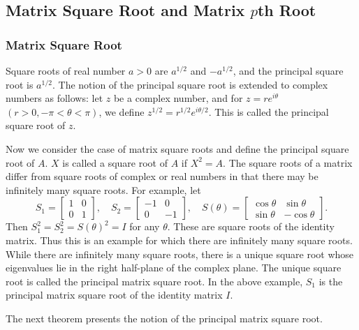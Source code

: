 \subsection{{Matrix Square Root and Matrix $p$th Root}}\label{sec:matrix-roots}

\subsubsection{{Matrix Square Root}}\label{subsec:newton-matrix-square-root}

{Square roots of real number $a>0$ are $a^{1/2}$ and $-a^{1/2}$, and the principal square root is $a^{1/2}$. The notion of the principal square root is extended to complex numbers as follows: let $z$ be a complex number, and for $z=re^{i\theta}$ $(r>0,-\pi<\theta<\pi)$, we define $z^{1/2}=r^{1/2}e^{i\theta/2}$. This is called the principal square root of $z$.}

{Now we consider the case of matrix square roots and define the principal square root of $A$. $X$ is called a square root of $A$ if $X^2=A$. The square roots of a matrix differ from square roots of complex or real numbers in that there may be infinitely many square roots. For example, let}
\[S_1=\begin{bmatrix}1&0\\0&1\end{bmatrix},\quad S_2=\begin{bmatrix}-1&0\\0&-1\end{bmatrix},\quad S(\theta)=\begin{bmatrix}\cos\theta&\sin\theta\\\sin\theta&-\cos\theta\end{bmatrix}.\]
{Then $S_1^2=S_2^2=S(\theta)^2=I$ for any $\theta$. These are square roots of the identity matrix. Thus this is an example for which there are infinitely many square roots. While there are infinitely many square roots, there is a unique square root whose eigenvalues lie in the right half-plane of the complex plane. The unique square root is called the principal matrix square root. In the above example, $S_1$ is the principal matrix square root of the identity matrix $I$.}

{The next theorem presents the notion of the principal matrix square root.}

